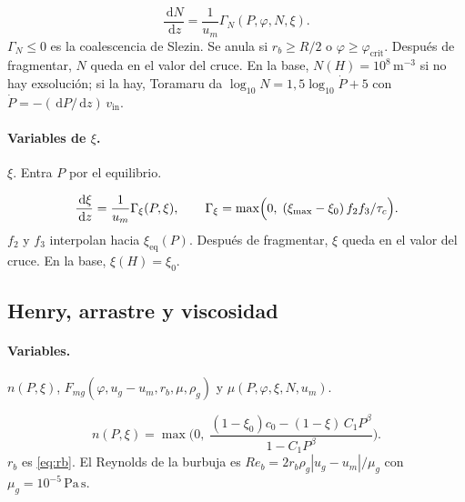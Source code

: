 \documentclass[11pt,a4paper]{article}
\newcommand{\dd}{\,\mathrm{d}}
\newcommand{\vin}{v_{\mathrm{in}}}
\begin{document}
\begin{equation}
\label{eq:N-1d}
\frac{\dd N}{\dd z}
=\frac{1}{u_m}\Gamma_N(P,\varphi,N,\xi).
\end{equation}
$\Gamma_N\le 0$ es la coalescencia de Slezin. Se anula si
$r_b\ge R/2$ o $\varphi\ge\varphi_{\mathrm{crit}}$. Después de
fragmentar, $N$ queda en el valor del cruce. En la base,
$N(H)=10^{8}\,\mathrm{m^{-3}}$ si no hay exsolución; si la hay,
Toramaru da $\log_{10}N=1{,}5\log_{10}\dot P+5$ con
$\dot P=-(\dd P/\dd z)\,\vin$.

\paragraph{Variables de $\xi$.}
$\xi$. Entra $P$ por el equilibrio.

\begin{equation}
\label{eq:xi-1d}
\frac{\dd\xi}{\dd z}
=\frac{1}{u_m}\Gamma_\xi(P,\xi),
\qquad
\Gamma_\xi
=\max\Bigl(0,\;
(\xi_{\max}-\xi_0)\,f_2 f_3/\tau_c\Bigr).
\end{equation}
$f_2$ y $f_3$ interpolan hacia $\xi_{\mathrm{eq}}(P)$. Después de
fragmentar, $\xi$ queda en el valor del cruce. En la base,
$\xi(H)=\xi_0$.

\subsection{Henry, arrastre y viscosidad}

\paragraph{Variables.}
$n(P,\xi)$, $F_{mg}(\varphi,u_g-u_m,r_b,\mu,\rho_g)$ y
$\mu(P,\varphi,\xi,N,u_m)$.

\begin{equation}
\label{eq:henry}
n(P,\xi)
=\max\Biggl(0,\;
\frac{(1-\xi_0)c_0-(1-\xi)\,C_1 P^{\beta}}{1-C_1 P^{\beta}}\Biggr).
\end{equation}
$r_b$ es \eqref{eq:rb}. El Reynolds de la burbuja es
$Re_b=2r_b\rho_g|u_g-u_m|/\mu_g$ con
$\mu_g=10^{-5}\,\mathrm{Pa\,s}$.
\end{document}
